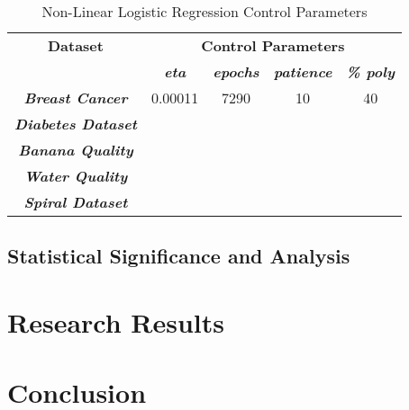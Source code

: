 \documentclass[10pt, conference]{IEEEtran}
\begin{document}
\begin{table}[h!]
    \caption{Non-Linear Logistic Regression Control Parameters}
    \begin{center}
        \begin{tabular}{|c||c|c|c|c|}
            \hline
            \textbf{Dataset}&\multicolumn{4}{|c|}{\textbf{Control Parameters}} \\
            \cline{2-5}
                        & \textbf{\textit{eta}} & \textbf{\textit{epochs}} & \textbf{\textit{patience}} & \textbf{\textit{\% poly}}\\
            \hline
            \textbf{\textit{Breast Cancer}} & 0.00011 & 7290 & 10 & 40\\
            \textbf{\textit{Diabetes Dataset}} &  &  &  & \\
            \textbf{\textit{Banana Quality}}  &  &  &  & \\
            \textbf{\textit{Water Quality}} &  &  &  & \\
            \textbf{\textit{Spiral Dataset}} &  &  &  & \\
            \hline
        \end{tabular}
    \end{center}
    \label{table: NLR_control_parameters}
\end{table}

\subsection{Statistical Significance and Analysis}

\section{Research Results} \label{section: Research Results}

\section{Conclusion} \label{section: Conclusion}
\end{document}
